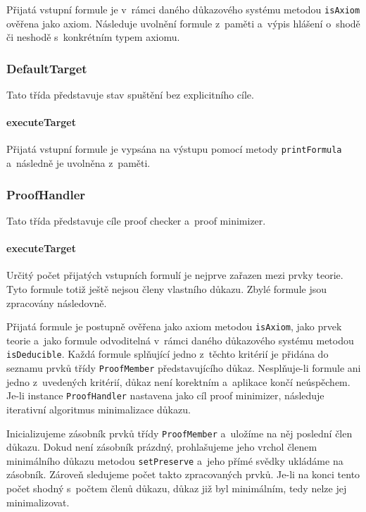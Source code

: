 \documentclass[thesis=B,czech,hidelinks]{thesis}[2012/06/26]
\begin{document}
Přijatá vstupní formule je v~rámci daného důkazového systému metodou \texttt{isAxiom} ověřena jako axiom. Následuje uvolnění formule z~paměti a~výpis hlášení o~shodě či neshodě s~konkrétním typem axiomu.

\subsubsection{DefaultTarget}

Tato třída představuje stav spuštění bez explicitního cíle.

\paragraph{executeTarget}

Přijatá vstupní formule je vypsána na výstupu pomocí metody \texttt{printFormula} a~následně je uvolněna z~paměti.

\subsubsection{ProofHandler}

Tato třída představuje cíle proof checker a~proof minimizer.

\paragraph{executeTarget}

Určitý počet přijatých vstupních formulí je nejprve zařazen mezi prvky teorie. Tyto formule totiž ještě nejsou členy vlastního důkazu. Zbylé formule jsou zpracovány následovně.

Přijatá formule je postupně ověřena jako axiom metodou \texttt{isAxiom}, jako prvek teorie a~jako formule odvoditelná v~rámci daného důkazového systému metodou \texttt{isDeducible}. Každá formule splňující jedno z~těchto kritérií je přidána do seznamu prvků třídy \texttt{ProofMember} představujícího důkaz. Nesplňuje-li formule ani jedno z~uvedených kritérií, důkaz není korektním a~aplikace končí neúspěchem. Je-li instance \texttt{ProofHandler} nastavena jako cíl proof minimizer, následuje iterativní algoritmus minimalizace důkazu.

Inicializujeme zásobník prvků třídy \texttt{ProofMember} a~uložíme na něj poslední člen důkazu. Dokud není zásobník prázdný, prohlašujeme jeho vrchol členem minimálního důkazu metodou \texttt{setPreserve} a~jeho přímé svědky ukládáme na zásobník. Zároveň sledujeme počet takto zpracovaných prvků. Je-li na konci tento počet shodný s~počtem členů důkazu, důkaz již byl minimálním, tedy nelze jej minimalizovat.
\end{document}
